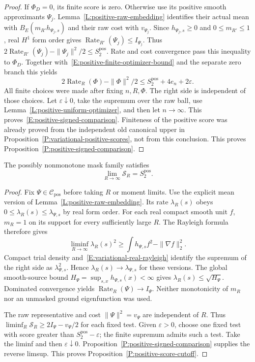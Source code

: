 \begin{proof}
  If $\Phi_D=0$, its finite score is zero.
  Otherwise use its positive smooth approximants $\Psi_j$.
  Lemma~\ref{L:positive-raw-embedding} identifies their actual mean
  with $B_E(m_{R'}h_{\Psi_j,s})$ and their raw cost with $v_{\Psi_j}$.
  Since $h_{\Psi_j,s}\ge0$ and $0\le m_{R'}\le1$, real $H^1$ form order gives
  $\operatorname{Rate}_{R'}(\Psi_j)\le I_{\Psi_j}$.
  Thus
  $2\operatorname{Rate}_{R'}(\Psi_j)-\|\Psi_j\|^2/2
  \le S_2^{\mathrm{pos}}$.
  Rate and cost convergence pass this inequality to $\Phi_D$.
  Together with~\eqref{E:positive-finite-optimizer-bound} and the
  separate zero branch this yields
  \[
    2\operatorname{Rate}_R(\Phi)-\|\Phi\|^2/2
    \le S_2^{\mathrm{pos}}+4e_n+2\varepsilon .
  \]
  All finite choices were made after fixing $n,R,\Phi$.
  The right side is independent of those choices.
  Let $\varepsilon\downarrow0$, take the supremum over the raw ball,
  use Lemma~\ref{L:positive-uniform-optimizer}, and then let $n\to\infty$.
  This proves~\eqref{E:positive-signed-comparison}.
  Finiteness of the positive score was already proved from the
  independent old canonical upper in
  Proposition~\ref{P:variational-positive-scores}, not from this conclusion.
  This proves Proposition~\ref{P:positive-signed-comparison}.
\end{proof}

\begin{proposition}
  \label{P:positive-score-cutoff}
  The possibly nonmonotone mask family satisfies
  \[
    \lim_{R\to\infty}\mathcal S_R=S_2^{\mathrm{pos}}.
  \]
\end{proposition}

\begin{proof}
  Fix $\Psi\in\mathcal C_{\mathrm{pos}}$ before taking $R$ or moment limits.
  Use the explicit mean version of Lemma~\ref{L:positive-raw-embedding}.
  Its rate $\lambda_R(s)$ obeys
  $0\le\lambda_R(s)\le\lambda_{\Psi,s}$ by real form order.
  For each real compact smooth unit $f$, $m_R=1$ on its support for
  every sufficiently large $R$. The Rayleigh formula therefore gives
  \[
    \liminf_{R\to\infty}\lambda_R(s)^2
    \ge\int h_{\Psi,s}f^2-\|\nabla f\|_2^2.
  \]
  Compact trial density and~\eqref{E:variational-real-rayleigh}
  identify the supremum of the right side as $\lambda_{\Psi,s}^2$.
  Hence $\lambda_R(s)\to\lambda_{\Psi,s}$ for these versions.
  The global smooth-source bound
  $H_\Psi=\sup_{s,x}h_{\Psi,s}(x)<\infty$ gives
  $\lambda_R(s)\le\sqrt{H_\Psi}$.
  Dominated convergence yields
  $\operatorname{Rate}_R(\Psi)\to I_\Psi$.
  Neither monotonicity of $m_R$ nor an unmasked ground eigenfunction was used.

  The raw representative and cost $\|\Psi\|^2=v_\Psi$ are independent of $R$.
  Thus
  $\liminf_R\mathcal S_R\ge2I_\Psi-v_\Psi/2$ for each fixed test.
  Given $\varepsilon>0$, choose one fixed test with score greater than
  $S_2^{\mathrm{pos}}-\varepsilon$; the finite supremum admits such a test.
  Take the liminf and then $\varepsilon\downarrow0$.
  Proposition~\ref{P:positive-signed-comparison} supplies the reverse limsup.
  This proves Proposition~\ref{P:positive-score-cutoff}.
\end{proof}

